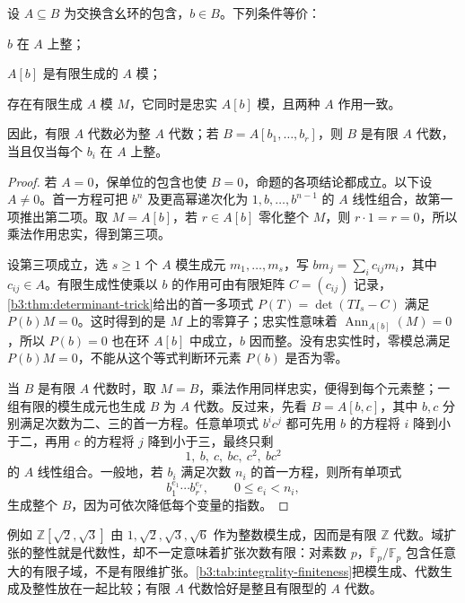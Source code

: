 \begin{proposition}[整性的有限生成模判据]\label{b3:prop:integral-finite-criterion}
	设 \(A\subseteq B\) 为交换含幺环的包含，\(b\in B\)。下列条件等价：
	\begin{equivalences}
		\item \(b\) 在 \(A\) 上整；
		\item \(A[b]\) 是有限生成的 \(A\) 模；
		\item 存在有限生成 \(A\) 模 \(M\)，它同时是忠实 \(A[b]\) 模，且两种 \(A\) 作用一致。
	\end{equivalences}
	因此，有限 \(A\) 代数必为整 \(A\) 代数；若 \(B=A[b_1,\ldots,b_r]\)，则 \(B\) 是有限 \(A\) 代数，当且仅当每个 \(b_i\) 在 \(A\) 上整。
\end{proposition}
\begin{proof}
	若 \(A=0\)，保单位的包含也使 \(B=0\)，命题的各项结论都成立。以下设 \(A\ne0\)。首一方程可把 \(b^n\) 及更高幂递次化为 \(1,b,\ldots,b^{n-1}\) 的 \(A\) 线性组合，故第一项推出第二项。取 \(M=A[b]\)，若 \(r\in A[b]\) 零化整个 \(M\)，则 \(r\cdot1=r=0\)，所以乘法作用忠实，得到第三项。

	设第三项成立，选 \(s\ge1\) 个 \(A\) 模生成元 \(m_1,\ldots,m_s\)，写 \(bm_j=\sum_i c_{ij}m_i\)，其中 \(c_{ij}\in A\)。有限生成性使乘以 \(b\) 的作用可由有限矩阵 \(C=(c_{ij})\) 记录，\cref{b3:thm:determinant-trick}给出的首一多项式 \(P(T)=\det(TI_s-C)\) 满足 \(P(b)M=0\)。这时得到的是 \(M\) 上的零算子；忠实性意味着 \(\operatorname{Ann}_{A[b]}(M)=0\)，所以 \(P(b)=0\) 也在环 \(A[b]\) 中成立，\(b\) 因而整。没有忠实性时，零模总满足 \(P(b)M=0\)，不能从这个等式判断环元素 \(P(b)\) 是否为零。

	当 \(B\) 是有限 \(A\) 代数时，取 \(M=B\)，乘法作用同样忠实，便得到每个元素整；一组有限的模生成元也生成 \(B\) 为 \(A\) 代数。反过来，先看 \(B=A[b,c]\)，其中 \(b,c\) 分别满足次数为二、三的首一方程。任意单项式 \(b^ic^j\) 都可先用 \(b\) 的方程将 \(i\) 降到小于二，再用 \(c\) 的方程将 \(j\) 降到小于三，最终只剩
	\[
		1,\ b,\ c,\ bc,\ c^2,\ bc^2
	\]
	的 \(A\) 线性组合。一般地，若 \(b_i\) 满足次数 \(n_i\) 的首一方程，则所有单项式
	\[
		b_1^{e_1}\cdots b_r^{e_r},\qquad 0\le e_i<n_i,
	\]
	生成整个 \(B\)，因为可依次降低每个变量的指数。
\end{proof}

例如 \(\mathbb Z[\sqrt2,\sqrt3]\) 由 \(1,\sqrt2,\sqrt3,\sqrt6\) 作为整数模生成，因而是有限 \(\mathbb Z\) 代数。域扩张的整性就是代数性，却不一定意味着扩张次数有限：对素数 \(p\)，\(\overline{\mathbb F}_p/\mathbb F_p\) 包含任意大的有限子域，不是有限维扩张。\cref{b3:tab:integrality-finiteness}把模生成、代数生成及整性放在一起比较；有限 \(A\) 代数恰好是整且有限型的 \(A\) 代数。


